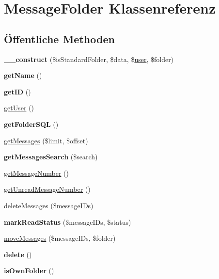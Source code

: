 \hypertarget{class_message_folder}{}\section{Message\+Folder Klassenreferenz}
\label{class_message_folder}
\subsection*{Öffentliche Methoden}
\begin{DoxyCompactItemize}
\item 
\mbox{\label{class_message_folder_a2e2c9df9958ab08b6f45456d7a13073d}} 
{\bfseries \+\_\+\+\_\+construct} (\$is\+Standard\+Folder, \$data, \$\mbox{\hyperlink{classuser}{user}}, \$folder)
\item 
\mbox{\label{class_message_folder_a2b7cebebd9b77c777af887b8b796ae93}} 
{\bfseries get\+Name} ()
\item 
\mbox{\label{class_message_folder_ad300fec41e5a25c7bad4f81d9bffaf59}} 
{\bfseries get\+ID} ()
\item 
\mbox{\hyperlink{class_message_folder_a8157f15aee7a7968f6ce4dd8c4901de5}{get\+User}} ()
\item 
\mbox{\label{class_message_folder_a3ccdea86ab97317c9188733375716059}} 
{\bfseries get\+Folder\+S\+QL} ()
\item 
\mbox{\hyperlink{class_message_folder_ab287a9fb727864cdfc8364fac94b1f71}{get\+Messages}} (\$limit, \$offset)
\item 
\mbox{\label{class_message_folder_a52b02a1f807585dc7dad048501172cdf}} 
{\bfseries get\+Messages\+Search} (\$search)
\item 
\mbox{\hyperlink{class_message_folder_ab7640b7d73b5037920efeadb25e5aa3a}{get\+Message\+Number}} ()
\item 
\mbox{\hyperlink{class_message_folder_a86065e5cc85eb0c995f79053bdfa122b}{get\+Unread\+Message\+Number}} ()
\item 
\mbox{\hyperlink{class_message_folder_a33202c1c3c693ab579c53fca35e69862}{delete\+Messages}} (\$message\+I\+Ds)
\item 
\mbox{\label{class_message_folder_a359f449acf9e34a77814febbdfc1d54b}} 
{\bfseries mark\+Read\+Status} (\$message\+I\+Ds, \$status)
\item 
\mbox{\hyperlink{class_message_folder_aae912619f4d1d5569c2eaf623c949ee2}{move\+Messages}} (\$message\+I\+Ds, \$folder)
\item 
\mbox{\label{class_message_folder_ae378590d1d89df880e98a035e2834de4}} 
{\bfseries delete} ()
\item 
\mbox{\label{class_message_folder_af5ed0eed92777398ea63ef80a10c8dfe}} 
{\bfseries is\+Own\+Folder} ()
\end{DoxyCompactItemize}
